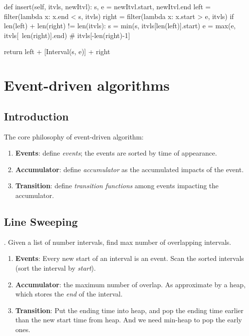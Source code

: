 \begin{python}
def insert(self, itvls, newItvl):
    s, e = newItvl.start, newItvl.end
    left = filter(lambda x: x.end < s, itvls)
    right = filter(lambda x: x.start > e, itvls)
    if len(left) + len(right) != len(itvls):
        s = min(s, itvls[len(left)].start)
        e = max(e, itvls[~len(right)].end)
        # itvls[-len(right)-1]

    return left + [Interval(s, e)] + right
\end{python}

\section{Event-driven algorithms}
\subsection{Introduction}
The core philosophy of event-driven algorithm:
\begin{enumerate}
\item \textbf{Events}: define \textit{events}; the events are sorted by time of appearance.
\item \textbf{Accumulator}: define \textit{accumulator} as the accumulated impacts of the event.
\item \textbf{Transition}: define \textit{transition functions} among events impacting the accumulator.
\end{enumerate} 

\subsection{Line Sweeping}
. Given a list of number intervals, find max number of overlapping
intervals.

\begin{enumerate}
\item \textbf{Events}: Every new start of an interval is an event. Scan the sorted intervals (sort the interval by \textit{start}).
\item \textbf{Accumulator}: the maximum number of overlap. As approximate by a heap, which stores the \textit{end} of the interval. 
\item \textbf{Transition}: Put the ending time into heap, and pop the ending time earlier than the new start time from heap. And we need min-heap to pop the early ones.
\end{enumerate}


